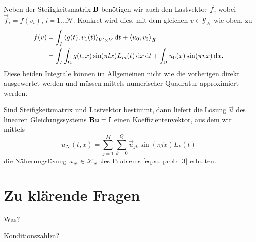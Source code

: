 
Neben der Steifigkeitsmatrix $\mathbf{B}$ benötigen wir auch den Lastvektor $\vec f$, wobei $\vec f_{i} = f(v_{i})$, $i = 1 \dots \mathcal N$.
Konkret wird dies, mit dem gleichen $v \in \mathcal Y_{\mathcal N}$ wie oben, zu
\begin{align}
    f(v)
    &= \int_{I} \left\langle g(t),v_{1}(t)\right\rangle_{V' \times V} \mathop{}\!\mathrm{d} t + \left\langle u_{0},v_{2}\right\rangle_{H}
    \\&= \int_{I} \int_{\Omega} g(t, x) \sin(\pi l x) L_{m}(t) \mathop{}\!\mathrm{d} x \mathop{}\!\mathrm{d} t + \int_{\Omega} u_{0}(x) \sin(\pi n x) \mathop{}\!\mathrm{d} x.
\end{align}
Diese beiden Integrale können im Allgemeinen nicht wie die vorherigen direkt ausgewertet werden und müssen mittels numerischer Quadratur approximiert werden.

Sind Steifigkeitsmatrix und Lastvektor bestimmt, dann liefert die Lösung $\vec u$ des linearen Gleichungssystems $\mathbf{B} \mathbf{u} = \mathbf{f}$ einen Koeffizientenvektor, aus dem wir mittels
\begin{equation}
    u_{\mathcal N}(t, x) = \sum_{j = 1}^{M} \sum_{k = 0}^{Q} \vec u_{jk} \sin(\pi j x) L_{k}(t)
\end{equation}
die Näherungslösung $u_{\mathcal N} \in \mathcal X_{\mathcal N}$ des Problems \eqref{eq:varprob_3} erhalten.



\clearpage
\section{Zu klärende Fragen} %
\label{sec:zu_kl_rende_fragen}

Was?

Konditionszahlen?


